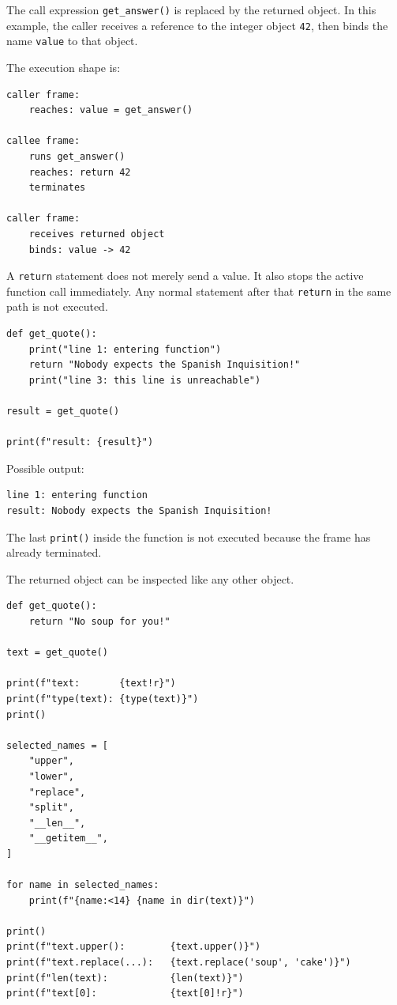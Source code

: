 The call expression \texttt{get\_answer()} is replaced by the returned object. In this example, the caller receives a reference to the integer object \texttt{42}, then binds the name \texttt{value} to that object.

The execution shape is:

\begin{verbatim}
caller frame:
    reaches: value = get_answer()

callee frame:
    runs get_answer()
    reaches: return 42
    terminates

caller frame:
    receives returned object
    binds: value -> 42
\end{verbatim}

A \texttt{return} statement does not merely send a value. It also stops the active function call immediately. Any normal statement after that \texttt{return} in the same path is not executed.

\begin{verbatim}
def get_quote():
    print("line 1: entering function")
    return "Nobody expects the Spanish Inquisition!"
    print("line 3: this line is unreachable")

result = get_quote()

print(f"result: {result}")
\end{verbatim}

Possible output:

\begin{verbatim}
line 1: entering function
result: Nobody expects the Spanish Inquisition!
\end{verbatim}

The last \texttt{print()} inside the function is not executed because the frame has already terminated.

The returned object can be inspected like any other object.

\begin{verbatim}
def get_quote():
    return "No soup for you!"

text = get_quote()

print(f"text:       {text!r}")
print(f"type(text): {type(text)}")
print()

selected_names = [
    "upper",
    "lower",
    "replace",
    "split",
    "__len__",
    "__getitem__",
]

for name in selected_names:
    print(f"{name:<14} {name in dir(text)}")

print()
print(f"text.upper():        {text.upper()}")
print(f"text.replace(...):   {text.replace('soup', 'cake')}")
print(f"len(text):           {len(text)}")
print(f"text[0]:             {text[0]!r}")
\end{verbatim}

